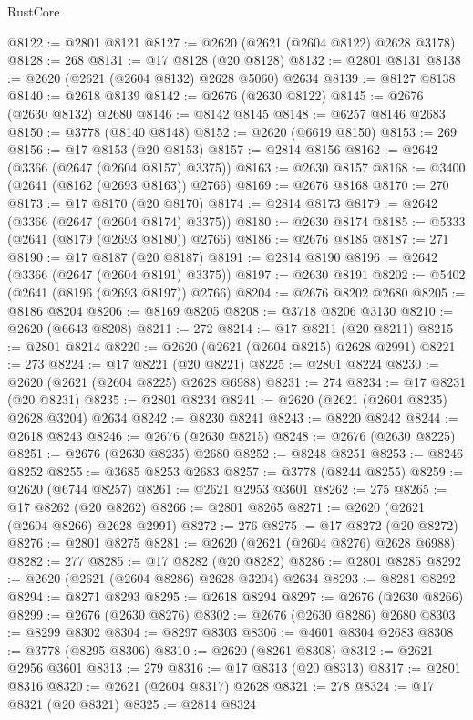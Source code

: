 \begin{lexlean}{RustCore}
\begin{coremodule}
@8122 := @2801 @8121
@8127 := @2620 (@2621 (@2604 @8122) @2628 @3178)
@8128 := 268
@8131 := @17 @8128 (@20 @8128)
@8132 := @2801 @8131
@8138 := @2620 (@2621 (@2604 @8132) @2628 @5060) @2634
@8139 := @8127 @8138
@8140 := @2618 @8139
@8142 := @2676 (@2630 @8122)
@8145 := @2676 (@2630 @8132) @2680
@8146 := @8142 @8145
@8148 := @6257 @8146 @2683
@8150 := @3778 (@8140 @8148)
@8152 := @2620 (@6619 @8150)
@8153 := 269
@8156 := @17 @8153 (@20 @8153)
@8157 := @2814 @8156
@8162 := @2642 (@3366 (@2647 (@2604 @8157) @3375))
@8163 := @2630 @8157
@8168 := @3400 (@2641 (@8162 (@2693 @8163)) @2766)
@8169 := @2676 @8168
@8170 := 270
@8173 := @17 @8170 (@20 @8170)
@8174 := @2814 @8173
@8179 := @2642 (@3366 (@2647 (@2604 @8174) @3375))
@8180 := @2630 @8174
@8185 := @5333 (@2641 (@8179 (@2693 @8180)) @2766)
@8186 := @2676 @8185
@8187 := 271
@8190 := @17 @8187 (@20 @8187)
@8191 := @2814 @8190
@8196 := @2642 (@3366 (@2647 (@2604 @8191) @3375))
@8197 := @2630 @8191
@8202 := @5402 (@2641 (@8196 (@2693 @8197)) @2766)
@8204 := @2676 @8202 @2680
@8205 := @8186 @8204
@8206 := @8169 @8205
@8208 := @3718 @8206 @3130
@8210 := @2620 (@6643 @8208)
@8211 := 272
@8214 := @17 @8211 (@20 @8211)
@8215 := @2801 @8214
@8220 := @2620 (@2621 (@2604 @8215) @2628 @2991)
@8221 := 273
@8224 := @17 @8221 (@20 @8221)
@8225 := @2801 @8224
@8230 := @2620 (@2621 (@2604 @8225) @2628 @6988)
@8231 := 274
@8234 := @17 @8231 (@20 @8231)
@8235 := @2801 @8234
@8241 := @2620 (@2621 (@2604 @8235) @2628 @3204) @2634
@8242 := @8230 @8241
@8243 := @8220 @8242
@8244 := @2618 @8243
@8246 := @2676 (@2630 @8215)
@8248 := @2676 (@2630 @8225)
@8251 := @2676 (@2630 @8235) @2680
@8252 := @8248 @8251
@8253 := @8246 @8252
@8255 := @3685 @8253 @2683
@8257 := @3778 (@8244 @8255)
@8259 := @2620 (@6744 @8257)
@8261 := @2621 @2953 @3601
@8262 := 275
@8265 := @17 @8262 (@20 @8262)
@8266 := @2801 @8265
@8271 := @2620 (@2621 (@2604 @8266) @2628 @2991)
@8272 := 276
@8275 := @17 @8272 (@20 @8272)
@8276 := @2801 @8275
@8281 := @2620 (@2621 (@2604 @8276) @2628 @6988)
@8282 := 277
@8285 := @17 @8282 (@20 @8282)
@8286 := @2801 @8285
@8292 := @2620 (@2621 (@2604 @8286) @2628 @3204) @2634
@8293 := @8281 @8292
@8294 := @8271 @8293
@8295 := @2618 @8294
@8297 := @2676 (@2630 @8266)
@8299 := @2676 (@2630 @8276)
@8302 := @2676 (@2630 @8286) @2680
@8303 := @8299 @8302
@8304 := @8297 @8303
@8306 := @4601 @8304 @2683
@8308 := @3778 (@8295 @8306)
@8310 := @2620 (@8261 @8308)
@8312 := @2621 @2956 @3601
@8313 := 279
@8316 := @17 @8313 (@20 @8313)
@8317 := @2801 @8316
@8320 := @2621 (@2604 @8317) @2628
@8321 := 278
@8324 := @17 @8321 (@20 @8321)
@8325 := @2814 @8324

\end{coremodule}
\end{lexlean}
